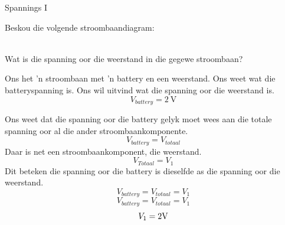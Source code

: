 \begin{wex}{Spannings I}{
Beskou die volgende stroombaandiagram:\\
\begin{center}
\end{center}\\
Wat is die spanning oor die weerstand in die gegewe stroombaan?
}{%
Ons het  'n stroombaan met  'n battery en een weerstand. Ons weet wat die
batteryspanning is. Ons wil uitvind wat die spanning oor die weerstand is.
\begin{equation*}
V_{battery} = 2~\text{V}
\end{equation*}

Ons weet dat die spanning oor die battery gelyk moet wees aan die totale
spanning oor al die ander stroombaankomponente.
\begin{equation*}
V_{battery} = V_{totaal}
\end{equation*}
Daar is net een stroombaankomponent, die weerstand.
\begin{equation*}
V_{Totaal} = V_{1}
\end{equation*}
Dit beteken die spanning oor die battery is dieselfde as die spanning oor
die weerstand.
\begin{equation*}
V_{battery} = V_{totaal} = V_{1}
\end{equation*}
\begin{equation*}
V_{battery} = V_{totaal} = V_{1}
\end{equation*}
\begin{equation*}
V_{1} = 2\rm{V}
\end{equation*}}\end{wex}
\clearpage

